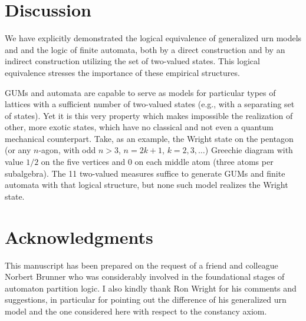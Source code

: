 \section{Discussion}
We have explicitly demonstrated the logical equivalence of
generalized urn models and and the logic of finite
automata, both by a direct construction and by an indirect construction utilizing the
set of two-valued states.
This logical equivalence stresses the importance of these empirical structures.

GUMs and automata are capable to
serve as models for particular types of lattices with a sufficient number
of two-valued states (e.g.,  with a separating set of states).
Yet it is this very property which makes impossible the
realization of other, more exotic states, which
have no classical and not even a quantum mechanical counterpart.
Take, as an example,
the Wright state
\cite{wright:pent,svozil-ql}
on
the pentagon (or any $n$-agon, with odd $n>3$, $n=2k+1$, $k=2,3,\ldots$) Greechie diagram
with value $1/2$ on the five vertices and $0$ on each middle atom (three atoms per subalgebra).
The 11 two-valued measures suffice to generate GUMs and finite automata with that logical structure,
but none such model realizes the Wright state.



\section*{Acknowledgments}
This manuscript has been prepared on the request of a friend and colleague Norbert Brunner
who was considerably involved in the foundational stages of automaton
partition logic. I also kindly thank Ron Wright for his comments and suggestions,
in particular for pointing out the difference of his generalized urn model and the one considered here
with respect to the constancy axiom.

%
%
%

